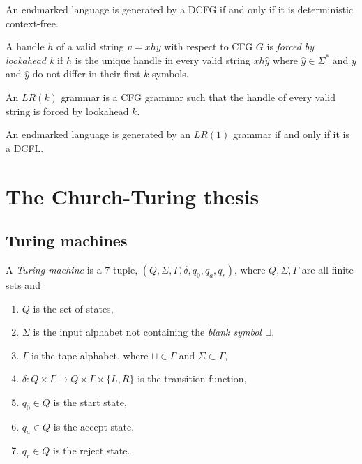 \documentclass{article}
\begin{document}
\begin{theorem}
    An endmarked language is generated by a DCFG if and only if it is deterministic context-free.
\end{theorem}

\begin{definition}
    A handle $h$ of a valid string $v=xhy$ with respect to CFG $G$ is \emph{forced by lookahead k}
    if $h$ is the unique handle in every valid string $xh\hat y$ where $\hat y\in\Sigma^*$ and
    $y$ and $\hat y$ do not differ in their first $k$ symbols.

    An $LR(k)$ grammar is a CFG grammar such that the handle of every valid string is forced by
    lookahead $k$.
\end{definition}

\begin{theorem}[Sipser p. 154]
    An endmarked language is generated by an $LR(1)$ grammar if and only if it is a DCFL.
\end{theorem}

\section{The Church-Turing thesis}

\subsection{Turing machines}

\begin{definition}
    A \emph{Turing machine} is a 7-tuple, $(Q, \Sigma, \Gamma, \delta, q_0, q_a, q_r)$,
    where $Q,\Sigma,\Gamma$ are all finite sets and
    \begin{enumerate}
        \item $Q$ is the set of states,
        \item $\Sigma$ is the input alphabet not containing the \emph{blank symbol $\sqcup$},
        \item $\Gamma$ is the tape alphabet, where $\sqcup\in\Gamma$ and $\Sigma\subset\Gamma$,
        \item $\delta:Q\times\Gamma\to Q\times\Gamma\times\{L,R\}$ is the transition function,
        \item $q_0\in Q$ is the start state,
        \item $q_a\in Q$ is the accept state,
        \item $q_r\in Q$ is the reject state.
    \end{enumerate}
\end{definition}
\end{document}
